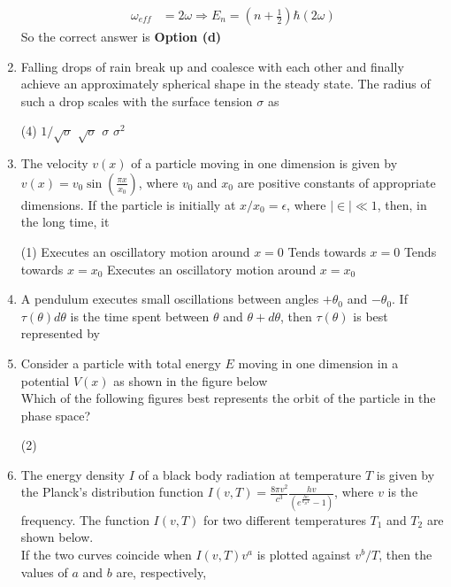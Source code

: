 \begin{enumerate}
\begin{answer}
\begin{align*}
\omega_{e f f}&=2 \omega \Rightarrow E_{n}=\left(n+\frac{1}{2}\right) \hbar(2 \omega)
	\end{align*}
		So the correct answer is \textbf{Option (d)}
\end{answer}
\item  Falling drops of rain break up and coalesce with each other and finally achieve an approximately spherical shape in the steady state. The radius of such a drop scales with the surface tension $\sigma$ as
	 \begin{tasks}(4)
		\task[\textbf{a.}]$1 / \sqrt{\sigma}$
		\task[\textbf{b.}] $\sqrt{\sigma}$
		\task[\textbf{c.}]$\sigma$
		\task[\textbf{d.}] $\sigma^{2}$
	\end{tasks}
\item  The velocity $v(x)$ of a particle moving in one dimension is given by $v(x)=v_{0} \sin \left(\frac{\pi x}{x_{0}}\right)$, where $v_{0}$ and $x_{0}$ are positive constants of appropriate dimensions. If the particle is initially at $x / x_{0}=\epsilon$, where $|\in| \ll 1$, then, in the long time, it
	 \begin{tasks}(1)
		\task[\textbf{a.}] Executes an oscillatory motion around $x=0$
		\task[\textbf{b.}]Tends towards $x=0$
		\task[\textbf{c.}] Tends towards $x=x_{0}$
		\task[\textbf{d.}] Executes an oscillatory motion around $x=x_{0}$
	\end{tasks}
\item  A pendulum executes small oscillations between angles $+\theta_{0}$ and $-\theta_{0}$. If $\tau(\theta) d \theta$ is the time spent between $\theta$ and $\theta+d \theta$, then $\tau(\theta)$ is best represented by
\item Consider a particle with total energy $E$ moving in one dimension in a potential $V(x)$ as shown in the figure below\\
Which of the following figures best represents the orbit of the particle in the phase space?
	 \begin{tasks}(2)
		\task[\textbf{a.}]
		\task[\textbf{b.}]
		\task[\textbf{c.}]
		\task[\textbf{d.}] 
	\end{tasks}
\item The energy density $I$ of a black body radiation at temperature $T$ is given by the Planck's distribution function $I(v, T)=\frac{8 \pi v^{2}}{c^{3}} \frac{h v}{\left(e^{\frac{h v}{k_{B} T}}-1\right)}$, where $v$ is the frequency. The function $I(v, T)$ for two different temperatures $T_{1}$ and $T_{2}$ are shown below.\\
 If the two curves coincide when $I(v, T) v^{a}$ is plotted against $v^{b} / T$, then the values of $a$ and $b$ are, respectively,

\end{enumerate}
